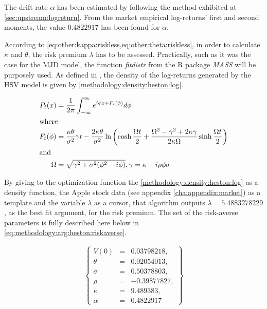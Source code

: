 \documentclass[12pt,a4paper]{report}
\begin{document}
The drift rate $\alpha$ has been estimated by following the method exhibited at \cref{sec:upstream:logreturn}. From the market empirical log-returns' first and second moments, the value $0.4822917$ has been found for $\alpha$.

According to \cref{eq:other:kappa:riskless,eq:other:theta:riskless}, in order to  calculate $\kappa$ and $\theta$, the risk premium $\lambda$ has to be assessed.
Practically, such as it was the case for the MJD model, the function \textit{fitdistr} from the R package \textit{MASS} will be purposely used. 
As defined in \citet{Adrian}, the density of the log-returns generated by the HSV model is given by \cref{methodology:density:heston:log}.

\begin{align}
P_t(x) &= \frac{1}{2 \pi} \int_{-\infty}^{\infty} e^{i \phi x + F_t(\phi)} d\phi \label{methodology:density:heston:log} \\
\intertext{where}
F_t(\phi) &= \frac{\kappa \theta}{\sigma^2} \gamma t -
  \frac{2 \kappa \theta}{\sigma ^2} \ln\left(
    \cosh \frac{\Omega t}{2} +
    \frac{\Omega^2 - \gamma^2 +2 \kappa \gamma}{2 \kappa \Omega} \sinh \frac{\Omega t}{2}
  \right) \notag \\
\intertext{and}
\Omega &= \sqrt{\gamma^2 + \sigma^2 (\phi^2 - i\phi)}, \notag
\gamma = \kappa + i \rho \phi \sigma \notag
\end{align}

By giving to the optimization function the \cref{methodology:density:heston:log} as a density function, the Apple stock data (see appendix \ref{cha:appendix:market}) as a template and the variable $\lambda$ as a cursor, that algorithm outputs $\lambda = 5.4883278229$, as the best fit argument, for the risk premium.
The set of the risk-averse parameters is fully described here below in \ref{eq:methodology:arg:heston:riskaverse}.

\begin{align}
  \left \{
  \begin{array}{lcl}
    V(0) &= &0.03798218, \\
    \theta &= &0.02054013, \\
    \sigma &= &0.50378803, \\
    \rho &= &-0.39877827, \\
    \kappa &= &9.489383, \\
    \alpha & = &0.4822917
  \end{array}
  \right \}  
  \label{eq:methodology:arg:heston:riskaverse}
\end{align}
\end{document}
